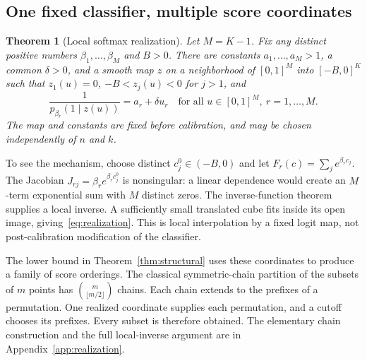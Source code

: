 \documentclass[10pt]{article}
\newtheorem{theorem}{Theorem}[section]
\theoremstyle{definition}\newtheorem{definition}[theorem]{Definition}
\theoremstyle{remark}\newtheorem{remark}[theorem]{Remark}
\newcommand{\1}{\mathbf 1}
\begin{document}
\subsection{One fixed classifier, multiple score coordinates}
\begin{theorem}[Local softmax realization]\label{thm:realization}
Let $M=K-1$. Fix any distinct positive numbers $\beta_1,\ldots,\beta_M$ and $B>0$. There are constants $a_1,\ldots,a_M>1$, a common $\delta>0$, and a smooth map $z$ on a neighborhood of $[0,1]^M$ into $[-B,0]^K$ such that $z_1(u)=0$, $-B<z_j(u)<0$ for $j>1$, and
\begin{equation}\label{eq:realization}
 \frac{1}{p_{\beta_r}(1\mid z(u))}=a_r+\delta u_r
 \quad\text{for all }u\in[0,1]^M,\ r=1,\ldots,M.
\end{equation}
The map and constants are fixed before calibration, and may be chosen independently of $n$ and $k$.
\end{theorem}
To see the mechanism, choose distinct $c_j^0\in(-B,0)$ and let $F_r(c)=\sum_j e^{\beta_r c_j}$. The Jacobian $J_{rj}=\beta_r e^{\beta_r c_j^0}$ is nonsingular: a linear dependence would create an $M$-term exponential sum with $M$ distinct zeros. The inverse-function theorem supplies a local inverse. A sufficiently small translated cube fits inside its open image, giving~\eqref{eq:realization}. This is local interpolation by a fixed logit map, not post-calibration modification of the classifier.

The lower bound in Theorem~\ref{thm:structural} uses these coordinates to produce a family of score orderings. The classical symmetric-chain partition of the subsets of $m$ points \citep{debruijn1951} has $\binom{m}{\lfloor m/2\rfloor}$ chains. Each chain extends to the prefixes of a permutation. One realized coordinate supplies each permutation, and a cutoff chooses its prefixes. Every subset is therefore obtained. The elementary chain construction and the full local-inverse argument are in Appendix~\ref{app:realization}.
\end{document}
